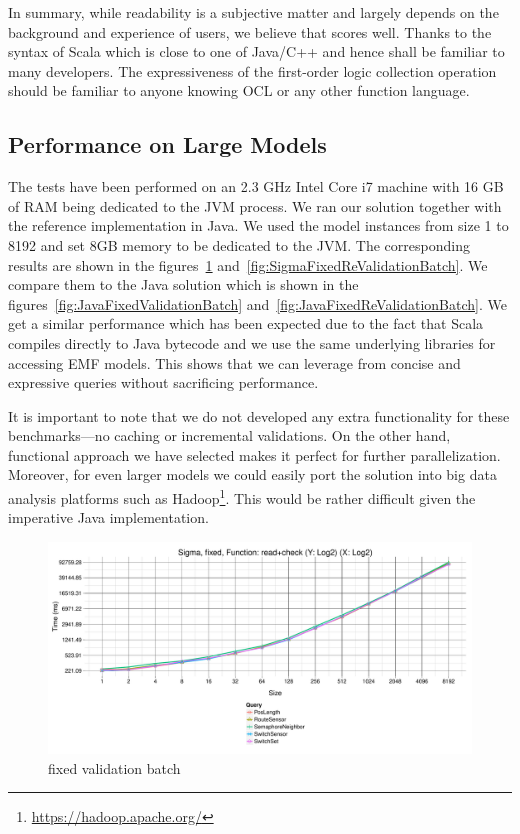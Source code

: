 In summary, while readability is a subjective matter and largely depends on the background and experience of users, we believe that \SIGMA scores well.
Thanks to the syntax of Scala which is close to one of Java/C++ and hence shall be familiar to many developers.
The expressiveness of the first-order logic collection operation should be familiar to anyone knowing OCL or any other function language.


\subsection{Performance on Large Models}

The tests have been performed on an 2.3 GHz Intel Core i7 machine with 16 GB of RAM being dedicated to the JVM process.
We ran our solution together with the reference implementation in Java.
We used the model instances from size 1 to 8192 and set 8GB memory to be dedicated to the JVM.
The corresponding results are shown in the figures~\ref{fig:SigmaFixedValidationBatch} and~\ref{fig:SigmaFixedReValidationBatch}.
We compare them to the Java solution which is shown in the figures~\ref{fig:JavaFixedValidationBatch} and~\ref{fig:JavaFixedReValidationBatch}.
We get a similar performance which has been expected due to the fact that Scala compiles directly to Java bytecode and we use the same underlying libraries for accessing EMF models.
This shows that we can leverage from concise and expressive queries without sacrificing performance.

It is important to note that we do not developed any extra functionality for these benchmarks---\Ie no caching or incremental validations.
On the other hand, functional approach we have selected makes it perfect for further parallelization.
Moreover, for even larger models we could easily port the solution into big data analysis platforms such as Hadoop\footnote{\url{https://hadoop.apache.org/}}.
This would be rather difficult given the imperative Java implementation.

\begin{figure}[h!tb]
  \centering
  \includegraphics[width=\textwidth]{figures/fixed-Sigma-GroupBy-Query-time-batch-validation.pdf}
  \caption{\SIGMA fixed validation batch}
  \label{fig:SigmaFixedValidationBatch}
\end{figure}

